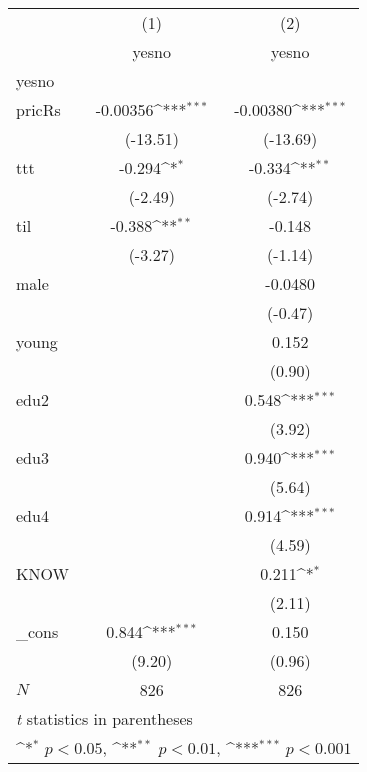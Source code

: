 {
\def\sym#1{\ifmmode^{#1}\else\(^{#1}\)\fi}
\begin{tabular}{l*{2}{c}}
\hline\hline
            &\multicolumn{1}{c}{(1)}&\multicolumn{1}{c}{(2)}\\
            &\multicolumn{1}{c}{yesno}&\multicolumn{1}{c}{yesno}\\
\hline
yesno       &                     &                     \\
pricRs      &    -0.00356\sym{***}&    -0.00380\sym{***}\\
            &    (-13.51)         &    (-13.69)         \\
[1em]
ttt         &      -0.294\sym{*}  &      -0.334\sym{**} \\
            &     (-2.49)         &     (-2.74)         \\
[1em]
til         &      -0.388\sym{**} &      -0.148         \\
            &     (-3.27)         &     (-1.14)         \\
[1em]
male        &                     &     -0.0480         \\
            &                     &     (-0.47)         \\
[1em]
young       &                     &       0.152         \\
            &                     &      (0.90)         \\
[1em]
edu2        &                     &       0.548\sym{***}\\
            &                     &      (3.92)         \\
[1em]
edu3        &                     &       0.940\sym{***}\\
            &                     &      (5.64)         \\
[1em]
edu4        &                     &       0.914\sym{***}\\
            &                     &      (4.59)         \\
[1em]
KNOW        &                     &       0.211\sym{*}  \\
            &                     &      (2.11)         \\
[1em]
\_cons      &       0.844\sym{***}&       0.150         \\
            &      (9.20)         &      (0.96)         \\
\hline
\(N\)       &         826         &         826         \\
\hline\hline
\multicolumn{3}{l}{\footnotesize \textit{t} statistics in parentheses}\\
\multicolumn{3}{l}{\footnotesize \sym{*} \(p<0.05\), \sym{**} \(p<0.01\), \sym{***} \(p<0.001\)}\\
\end{tabular}
}
